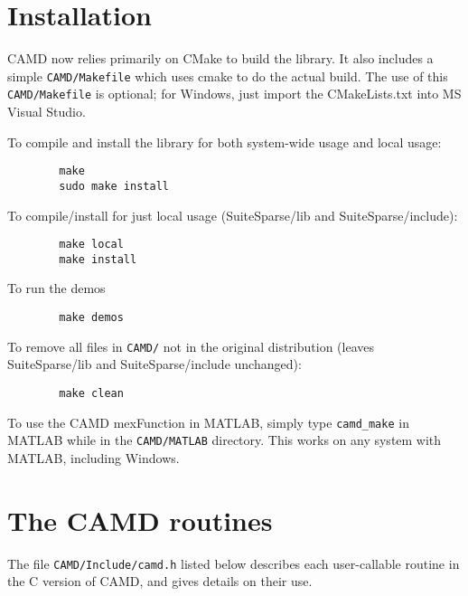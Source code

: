 \documentclass[11pt]{article}
\begin{document}
\section{Installation}
\label{Install}

CAMD now relies primarily on CMake to build the library.  It also includes
a simple \verb'CAMD/Makefile' which uses cmake to do the actual build.
The use of this \verb'CAMD/Makefile' is optional; for Windows, just import
the CMakeLists.txt into MS Visual Studio.

To compile and install the library for both system-wide usage and local
usage:

    \begin{verbatim}
        make
        sudo make install
    \end{verbatim}

To compile/install for just local usage (SuiteSparse/lib and
SuiteSparse/include):

    \begin{verbatim}
        make local
        make install
    \end{verbatim}

To run the demos

    \begin{verbatim}
        make demos
    \end{verbatim}

To remove all files in \verb'CAMD/' not in the original distribution (leaves
SuiteSparse/lib and SuiteSparse/include unchanged):

    \begin{verbatim}
        make clean
    \end{verbatim}

To use the CAMD mexFunction in MATLAB, simply type {\tt camd\_make} in MATLAB
while in the {\tt CAMD/MATLAB} directory.  This works on any system with MATLAB,
including Windows.

\newpage
\section{The CAMD routines}
\label{Primary}

The file {\tt CAMD/Include/camd.h} listed below
describes each user-callable routine in the C version of CAMD,
and gives details on their use.

{\footnotesize

}


\newpage



\end{document}

